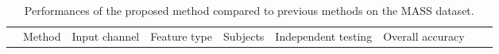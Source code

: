 \documentclass[10pt,twocolumn,twoside]{IEEEtran}
\begin{document}
\setlength\tabcolsep{2.5pt} \begin{table*}[t!]
		\caption{Performances of the proposed method compared to previous methods on the MASS dataset.}
		\vspace{-0.2cm}
		\scriptsize
		\begin{center}
			\begin{tabular}{|>{\arraybackslash}m{0.9in}|>{\arraybackslash}m{0.9in}|>{\arraybackslash}m{1.5in}|>{\arraybackslash}m{0.5in}|>{\centering\arraybackslash}m{0.6in}|>{\centering\arraybackslash}m{0.5in}|>{\centering\arraybackslash}m{0.4in}|>{\centering\arraybackslash}m{0in} @{}m{0pt}@{}}
				\cline{2-7}
				\multicolumn{1}{c|}{} & Method & Input channel & Feature type & Subjects & Independent testing & Overall accuracy &  \parbox{0pt}{\rule{0pt}{2ex+\baselineskip}} \\ [0ex]  	
				

\end{tabular}
\end{center}
\end{table*}
\end{document}
